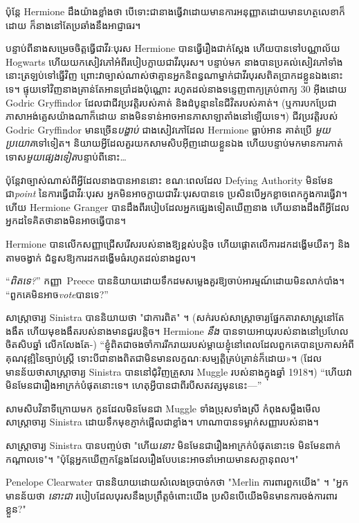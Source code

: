 ប៉ុន្តែ Hermione ដឹង​យ៉ាង​ខ្លាំង​ថា បើ​ទោះ​ជា​នាង​ធ្វើ​វា​ដោយ​មាន​ការ​អនុញ្ញាត​ដោយ​មាន​ហត្ថលេខា​ក៏​ដោយ ក៏​នាង​នៅ​តែ​ប្រឆាំង​នឹង​អាជ្ញាធរ។

បន្ទាប់ពីនាងសម្រេចចិត្តធ្វើជាវីរៈបុរស Hermione បានធ្វើរឿងជាក់ស្តែង ហើយបានទៅបណ្ណាល័យ Hogwarts ហើយយកសៀវភៅអំពីរបៀបក្លាយជាវីរបុរស។ បន្ទាប់មក នាងបានប្រគល់សៀវភៅទាំងនោះត្រឡប់ទៅធ្នើវិញ ព្រោះវាច្បាស់ណាស់ថាគ្មានអ្នកនិពន្ធណាម្នាក់ជាវីរបុរសពិតប្រាកដខ្លួនឯងនោះទេ។ ផ្ទុយទៅវិញនាងគ្រាន់តែអានប្រាំដងប៉ុណ្ណោះ រហូតដល់នាងទន្ទេញពាក្យគ្រប់ពាក្យ 30 អ៊ីងដោយ Godric Gryffindor ដែលជាជីវប្រវត្តិរបស់គាត់ និងដំបូន្មាននៃជីវិតរបស់គាត់។ (ឬការបកប្រែជាភាសាអង់គ្លេសយ៉ាងណាក៏ដោយ នាងមិនទាន់អាចអានភាសាឡាតាំងនៅឡើយទេ។) ជីវប្រវត្តិរបស់ Godric Gryffindor មានច្រើន\emph{បង្ហាប់} ជាងសៀវភៅដែល Hermione ធ្លាប់អាន គាត់ប្រើ \emph{មួយប្រយោគ}ទៅទៀត។ និយាយអ្វីដែលគួរយកសាមសិបអ៊ីញដោយខ្លួនឯង ហើយបន្ទាប់មកមានការកាត់ទោស\emph{មួយផ្សេងទៀត}បន្ទាប់ពីនោះ…

ប៉ុន្តែវាច្បាស់ណាស់ពីអ្វីដែលនាងបានអាននោះ ខណៈពេលដែល Defying Authority មិនមែនជា\emph{point} នៃការធ្វើជាវីរៈបុរស អ្នកមិនអាចក្លាយជាវីរៈបុរសបានទេ ប្រសិនបើអ្នកខ្លាចពេកក្នុងការធ្វើវា។ ហើយ Hermione Granger បានដឹងពីរបៀបដែលអ្នកផ្សេងទៀតឃើញនាង ហើយនាងដឹងពីអ្វីដែលអ្នកដទៃគិតថានាងមិនអាចធ្វើបាន។

Hermione បានលើកសញ្ញាជ្រើសរើសរបស់នាងឱ្យខ្ពស់បន្តិច ហើយផ្តោតលើការដកដង្ហើមយឺតៗ និងតាមចង្វាក់ ជំនួសឱ្យការដកដង្ហើមធំរហូតដល់នាងដួល។

“\emph{ពិតទេ?}” កញ្ញា~Preece បាននិយាយដោយទឹកដមសម្លេងគួរឱ្យចាប់អារម្មណ៍ដោយមិនលាក់បាំង។ “ពួកគេមិនអាច\emph{vote}បានទេ?”

សាស្រ្តាចារ្យ Sinistra បាននិយាយថា "ជាការពិត" ។ (សក់របស់សាស្រ្តាចារ្យផ្នែកតារាសាស្ត្រនៅតែងងឹត ហើយមុខងងឹតរបស់នាងមានជួរបន្តិច។ Hermione \emph{នឹង} បានទាយអាយុរបស់នាងនៅប្រហែលចិតសិបឆ្នាំ លើកលែងតែ-) “ខ្ញុំពិតជាចងចាំការរីករាយរបស់ម្តាយខ្ញុំនៅពេលដែលពួកគេបានប្រកាសអំពីគុណវុឌ្ឍិនៃច្បាប់ស្ត្រី ទោះបីជានាងពិតជាមិនមានលក្ខណៈសម្បត្តិគ្រប់គ្រាន់ក៏ដោយ»។ (ដែលមានន័យថាសាស្រ្តាចារ្យ Sinistra បាននៅជុំវិញគ្រួសារ Muggle របស់នាងក្នុងឆ្នាំ 1918។) “ហើយវាមិនមែនជារឿងអាក្រក់បំផុតនោះទេ។ ហេតុអ្វីបានជាពីរបីសតវត្សមុននេះ—”

សាមសិបវិនាទីក្រោយមក កូនដែលមិនមែនជា Muggle ទាំងប្រុសទាំងស្រី កំពុងសម្លឹងមើលសាស្រ្តាចារ្យ Sinistra ដោយទឹកមុខភ្ញាក់ផ្អើលជាខ្លាំង។ ហាណាបានទម្លាក់សញ្ញារបស់នាង។

សាស្រ្តាចារ្យ Sinistra បានបញ្ចប់ថា "ហើយ\emph{នោះ} មិនមែនជារឿងអាក្រក់បំផុតនោះទេ មិនមែនពាក់កណ្តាលទេ"។ "ប៉ុន្តែអ្នកឃើញកន្លែងដែលរឿងបែបនេះអាចនាំអោយមានសក្តានុពល។"

Penelope Clearwater បាននិយាយដោយសំលេងច្របាច់កថា "Merlin ការពារពួកយើង" ។ "អ្នកមានន័យថា \emph{នោះជា} របៀបដែលបុរសនឹងប្រព្រឹត្តចំពោះយើង ប្រសិនបើយើងមិនមានការចង់ការពារខ្លួន?"

